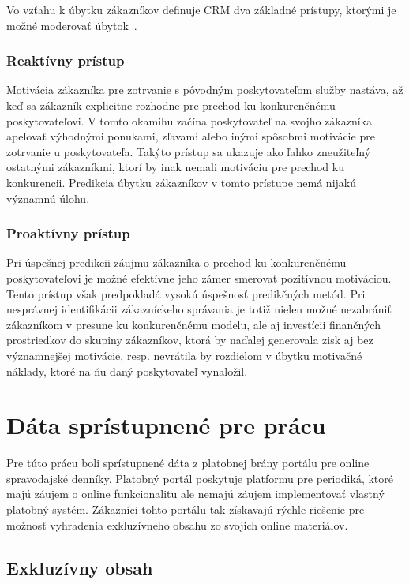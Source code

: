 Vo vzťahu k úbytku zákazníkov definuje CRM dva základné prístupy, ktorými je možné moderovať úbytok~\cite{burez2007crm}.

\subsubsection{Reaktívny prístup}
\label{analyza_reaktivny_pristup}

Motivácia zákazníka pre zotrvanie s pôvodným poskytovateľom služby nastáva, až keď sa zákazník explicitne rozhodne pre prechod ku konkurenčnému poskytovateľovi. V tomto okamihu začína poskytovateľ na svojho zákazníka apelovať výhodnými ponukami, zľavami alebo inými spôsobmi motivácie pre zotrvanie u poskytovateľa. Takýto prístup sa ukazuje ako ľahko zneužiteľný ostatnými zákazníkmi, ktorí by inak nemali motiváciu pre prechod ku konkurencii. Predikcia úbytku zákazníkov v tomto prístupe nemá nijakú významnú úlohu.

\subsubsection{Proaktívny prístup}
\label{analyza_proaktivny_pristup}

Pri úspešnej predikcii záujmu zákazníka o prechod ku konkurenčnému poskytovateľovi je možné efektívne jeho zámer smerovať pozitívnou motiváciou. Tento prístup však predpokladá vysokú úspešnosť predikčných metód. Pri nesprávnej identifikácii zákazníckeho správania je totiž nielen možné nezabrániť zákazníkom v presune ku konkurenčnému modelu, ale aj investícii finančných prostriedkov do skupiny zákazníkov, ktorá by naďalej generovala zisk aj bez významnejšej motivácie, resp. nevrátila by rozdielom v úbytku motivačné náklady, ktoré na ňu daný poskytovateľ vynaložil.

\section{Dáta sprístupnené pre prácu}
\label{analyza_data}

Pre túto prácu boli sprístupnené dáta z platobnej brány portálu pre online spravodajské denníky. Platobný portál poskytuje platformu pre periodiká, ktoré majú záujem o online funkcionalitu ale nemajú záujem implementovať vlastný platobný systém. Zákazníci tohto portálu tak získavajú rýchle riešenie pre možnosť vyhradenia exkluzívneho obsahu zo svojich online materiálov.

\subsection{Exkluzívny obsah}
\label{analyza_exkluzivny_obsah}

